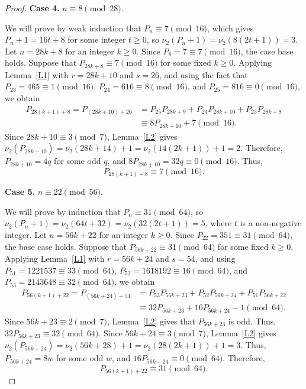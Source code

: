 \documentclass[11pt,a4paper]{article}
\numberwithin{equation}{section}
\numberwithin{table}{section}
\numberwithin{figure}{section}
\begin{document}
\begin{proof}
	\medskip
	\noindent\textbf{Case 4.} $n\equiv 8\pmod{28}$.
	
	We will prove by weak induction that $P_n\equiv 7\pmod{16}$, which gives $P_{n}+1=16t+8$ for some integer $t\ge 0$, so 
	$\nu_2(P_n+1)=\nu_{2}(8(2t+1))=3$. Let $n=28k+8$ for an integer $k\ge 0$. Since $P_8=7\equiv 7\pmod{16}$, the case base holds. Suppose that $P_{28k+8}\equiv 7\pmod{16}$ for some fixed $k\ge 0$. Applying 
	Lemma~\ref{L1} with $r=28k+10$ and $s=26$, and using the fact that
	$P_{23}=465\equiv 1\pmod{16}$, $P_{24}=616\equiv 8\pmod{16}$, and $P_{25}=816\equiv 0\pmod{16}$, 
	we obtain
	\begin{align*}
		P_{28(k+1)+8} = P_{(28k+10)+26}
		&= P_{25}P_{28k+9}+P_{24}P_{28k+10}
		+P_{23}P_{28k+8}\\
		&\equiv 8P_{28k+10}+7\pmod{16}.
	\end{align*}
	Since $28k+10\equiv 3\pmod{7}$, Lemma~\ref{L2} gives 
	$\nu_2(P_{28k+10})=\nu_2(28k+14)+1=\nu_2(14(2k+1))+1=2$. Therefore, $P_{28k+10}=4q$ for 
	some odd $q$, and 
	$8P_{28k+10}=32q\equiv 0\pmod{16}$. Thus,
	\begin{equation*}
		P_{28(k+1)+8}\equiv 7\pmod{16}.
	\end{equation*}
	
	\medskip
	\noindent\textbf{Case 5.} $n\equiv 22\pmod{56}$.
	
	We will prove by induction that $P_n\equiv 31\pmod{64}$, so
	$\nu_2(P_n+1)=\nu_{2}(64t+32)=\nu_{2}(32(2t+1))=5$, where $t$ is a non-negative integer. Let $n=56k+22$ for an integer $k\ge 0$. Since $P_{22}=351\equiv 31\pmod{64}$,  the base case holds. Suppose that 
	$P_{56k+22}\equiv 31\pmod{64}$ for some fixed $k\ge 0$. Applying Lemma~\ref{L1} 
	with $r=56k+24$ and $s=54$, and using
	$P_{51}=1221537\equiv 33\pmod{64}$, $P_{52}=1618192\equiv 16\pmod{64}$, and $P_{53}=2143648\equiv 32\pmod{64}$, we obtain
	\begin{align*}
		P_{56(k+1)+22} = P_{(56k+24)+54}
		&= P_{53}P_{56k+23}+P_{52}P_{56k+24}
		+P_{51}P_{56k+22}\\
		&\equiv 32P_{56k+23}+16P_{56k+24}
		-1\pmod{64}.
	\end{align*}
Since $56k+23\equiv 2\pmod{7}$, Lemma~\ref{L2} gives that $P_{56k+23}$ is odd. Thus, $32P_{56k+23}\equiv 32\pmod{64}$. Since $56k+24\equiv 3\pmod{7}$, Lemma~\ref{L2} gives $\nu_2(P_{56k+24})=\nu_2(56k+28)+1=\nu_2(28(2k+1))+1=3$. Thus, $P_{56k+24}=8w$ for some odd $w$, and $16P_{56k+24}\equiv 0\pmod{64}$. Therefore,
	\begin{equation*}
		P_{56(k+1)+22}\equiv 31\pmod{64}.
	\end{equation*}
	

\end{proof}
\end{document}
